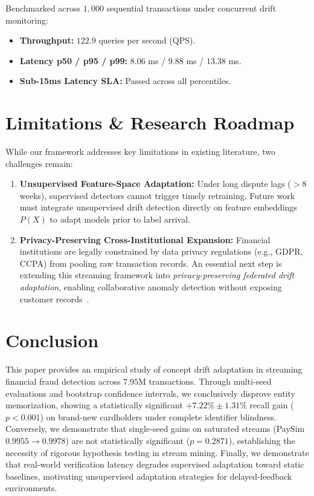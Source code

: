 \documentclass[10pt,conference,compsoc]{IEEEtran}
\begin{document}
Benchmarked across $1{,}000$ sequential transactions under concurrent drift monitoring:
\begin{itemize}
    \item \textbf{Throughput:} $122.9$ queries per second (QPS).
    \item \textbf{Latency p50 / p95 / p99:} $8.06$ ms / $9.88$ ms / $13.38$ ms.
    \item \textbf{Sub-15ms Latency SLA:} Passed across all percentiles.
\end{itemize}

\section{Limitations \& Research Roadmap}
\label{sec:roadmap}

While our framework addresses key limitations in existing literature, two challenges remain:
\begin{enumerate}
    \item \textbf{Unsupervised Feature-Space Adaptation:} Under long dispute lags ($> 8$ weeks), supervised detectors cannot trigger timely retraining. Future work must integrate unsupervised drift detection directly on feature embeddings $P(X)$ to adapt models prior to label arrival.
    \item \textbf{Privacy-Preserving Cross-Institutional Expansion:} Financial institutions are legally constrained by data privacy regulations (e.g., GDPR, CCPA) from pooling raw transaction records. An essential next step is extending this streaming framework into \textit{privacy-preserving federated drift adaptation}, enabling collaborative anomaly detection without exposing customer records~\cite{wang2024gtree}.
\end{enumerate}

\section{Conclusion}
\label{sec:conclusion}

This paper provides an empirical study of concept drift adaptation in streaming financial fraud detection across $7.95$M transactions. Through multi-seed evaluations and bootstrap confidence intervals, we conclusively disprove entity memorization, showing a statistically significant $+7.22\% \pm 1.31\%$ recall gain ($p < 0.001$) on brand-new cardholders under complete identifier blindness. Conversely, we demonstrate that single-seed gains on saturated streams (PaySim $0.9955 \to 0.9978$) are not statistically significant ($p = 0.2871$), establishing the necessity of rigorous hypothesis testing in stream mining. Finally, we demonstrate that real-world verification latency degrades supervised adaptation toward static baselines, motivating unsupervised adaptation strategies for delayed-feedback environments.



\end{document}

